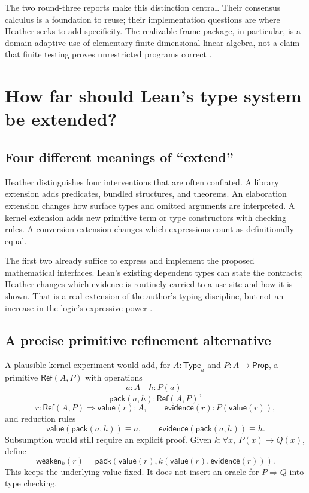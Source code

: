 \documentclass[11pt,letterpaper]{article}
\theoremstyle{definition}\newtheorem{definition}[theorem]{Definition}
\theoremstyle{remark}\newtheorem{remark}[theorem]{Remark}
\begin{document}
The two round-three reports make this distinction central. Their consensus
calculus is a foundation to reuse; their implementation questions are where
Heather seeks to add specificity. The realizable-frame package, in particular,
is a domain-adaptive use of elementary finite-dimensional linear algebra, not
a claim that finite testing proves unrestricted programs correct
\cite{round3a,round3b}.

\section{How far should Lean's type system be extended?}\label{sec:kernel}

\subsection{Four different meanings of ``extend''}
Heather distinguishes four interventions that are often conflated. A library
extension adds predicates, bundled structures, and theorems. An elaboration
extension changes how surface types and omitted arguments are interpreted.
A kernel extension adds new primitive term or type constructors with checking
rules. A conversion extension changes which expressions count as
definitionally equal.

The first two already suffice to express and implement the proposed mathematical
interfaces. Lean's existing dependent types can state the contracts; Heather
changes which evidence is routinely carried to a use site and how it is shown.
That is a real extension of the author's typing discipline, but not an increase
in the logic's expressive power \cite{lean-reference,round3a,round3b}.

\subsection{A precise primitive refinement alternative}
A plausible kernel experiment would add, for $A:\mathsf{Type}_u$ and
$P:A\to\mathsf{Prop}$, a primitive $\mathsf{Ref}(A,P)$ with operations
\[
 \frac{a:A\quad h:P(a)}{\mathsf{pack}(a,h):\mathsf{Ref}(A,P)},
\]
\[
 r:\mathsf{Ref}(A,P)\Longrightarrow
 \mathsf{value}(r):A,\qquad
 \mathsf{evidence}(r):P(\mathsf{value}(r)),
\]
and reduction rules
\[
 \mathsf{value}(\mathsf{pack}(a,h))\equiv a,
 \qquad
 \mathsf{evidence}(\mathsf{pack}(a,h))\equiv h.
\]
Subsumption would still require an explicit proof. Given
$k:\forall x,\ P(x)\to Q(x)$, define
\[
 \mathsf{weaken}_k(r)=
 \mathsf{pack}(\mathsf{value}(r),
               k(\mathsf{value}(r),\mathsf{evidence}(r))).
\]
This keeps the underlying value fixed. It does not insert an oracle for
$P\Rightarrow Q$ into type checking.
\end{document}
